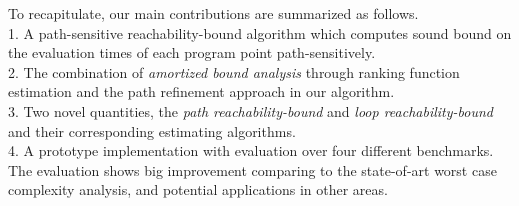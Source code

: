 To recapitulate, our main contributions are summarized as follows.
\\
1. A path-sensitive reachability-bound algorithm which computes sound bound on the evaluation times of each program point path-sensitively.
\\
2. The combination of \emph{amortized bound analysis} through ranking function estimation and the path refinement approach in our algorithm.
\\
3. Two novel quantities, the \emph{path reachability-bound} and \emph{loop reachability-bound} and their corresponding estimating algorithms.
\\
4. A prototype implementation with evaluation over four different benchmarks.
  The evaluation shows big improvement comparing to the state-of-art worst case complexity analysis, and potential applications in other areas.
